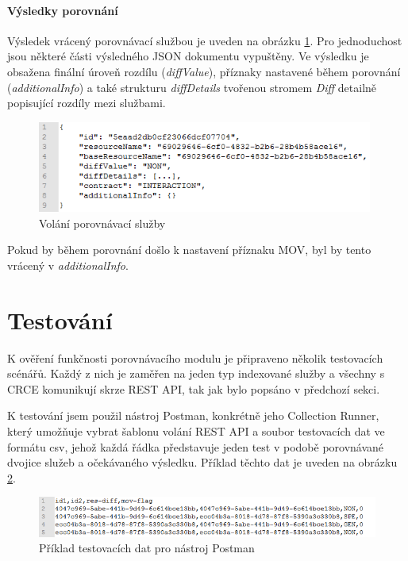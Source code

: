 \documentclass[czech,DP]{thesiskiv}
\begin{document}
\paragraph{Výsledky porovnání}
Výsledek vrácený porovnávací službou je uveden na obrázku \ref{fig:apicomp-res}. Pro jednoduchost jsou některé části výsledného JSON dokumentu vypuštěny. Ve výsledku je obsažena finální úroveň rozdílu (\textit{diffValue}), příznaky nastavené během porovnání (\textit{additionalInfo}) a také strukturu \textit{diffDetails} tvořenou stromem \textit{Diff} detailně popisující rozdíly mezi službami.

\begin{figure}[h]
	\centering
	\includegraphics[height=3cm]{apicomp-res.png}
	\caption{Volání porovnávací služby}
	\label{fig:apicomp-res}
\end{figure}

Pokud by během porovnání došlo k nastavení příznaku MOV, byl by tento vrácený v \textit{additionalInfo}.

\section{Testování}

K ověření funkčnosti porovnávacího modulu je připraveno několik testovacích scénářů. Každý z nich je zaměřen na jeden typ indexované služby a všechny s CRCE komunikují skrze REST API, tak jak bylo popsáno v předchozí sekci.

K testování jsem použil nástroj Postman, konkrétně jeho Collection Runner, který umožňuje vybrat šablonu volání REST API a soubor testovacích dat ve formátu csv, jehož každá řádka představuje jeden test v podobě porovnávané dvojice služeb a očekávaného výsledku. Příklad těchto dat je uveden na obrázku \ref{fig:test-data-csv}.

\begin{figure}[h]
	\centering
	\includegraphics[width=\linewidth]{test-data-csv.png}
	\caption{Příklad testovacích dat pro nástroj Postman}
	\label{fig:test-data-csv}
\end{figure}
\end{document}
